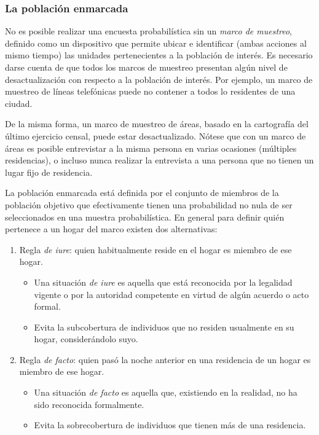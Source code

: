 \documentclass[
  12pt,
  spanish,
]{book}
\providecommand{\tightlist}{%
  \setlength{\itemsep}{0pt}\setlength{\parskip}{0pt}}
\begin{document}
\hypertarget{la-poblaciuxf3n-enmarcada}{%
\subsubsection{La población enmarcada}\label{la-poblaciuxf3n-enmarcada}}

No es posible realizar una encuesta probabilística sin un \emph{marco de muestreo}, definido como un dispositivo que permite ubicar e identificar (ambas acciones al mismo tiempo) las unidades pertenecientes a la población de interés. Es necesario darse cuenta de que todos los marcos de muestreo presentan algún nivel de desactualización con respecto a la población de interés. Por ejemplo, un marco de muestreo de líneas telefónicas puede no contener a todos lo residentes de una ciudad.

De la misma forma, un marco de muestreo de áreas, basado en la cartografía del último ejercicio censal, puede estar desactualizado. Nótese que con un marco de áreas es posible entrevistar a la misma persona en varias ocasiones (múltiples residencias), o incluso nunca realizar la entrevista a una persona que no tienen un lugar fijo de residencia.

La población enmarcada está definida por el conjunto de miembros de la población objetivo que efectivamente tienen una probabilidad no nula de ser seleccionados en una muestra probabilística. En general para definir quién pertenece a un hogar del marco existen dos alternativas:

\begin{enumerate}
\def\labelenumi{\arabic{enumi}.}
\tightlist
\item
  Regla \emph{de iure}: quien habitualmente reside en el hogar es miembro de ese hogar.

  \begin{itemize}
  \tightlist
  \item
    Una situación \emph{de iure} es aquella que está reconocida por la legalidad vigente o por la autoridad competente en virtud de algún acuerdo o acto formal.
  \item
    Evita la subcobertura de individuos que no residen usualmente en su hogar, considerándolo suyo.
  \end{itemize}
\item
  Regla \emph{de facto}: quien pasó la noche anterior en una residencia de un hogar es miembro de ese hogar.

  \begin{itemize}
  \tightlist
  \item
    Una situación \emph{de facto} es aquella que, existiendo en la realidad, no ha sido reconocida formalmente.
  \item
    Evita la sobrecobertura de individuos que tienen más de una residencia.
  \end{itemize}
\end{enumerate}
\end{document}

